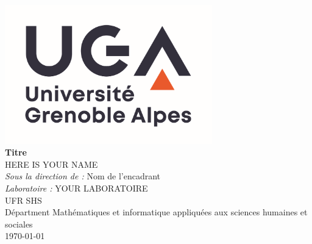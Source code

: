 \documentclass[12pt,oneside,french]{book}
\begin{document}
	\pagestyle{plain}


\frontmatter

\begin{titlepage}
	
	

\begin{center}
\includegraphics[width=9cm]{images/logo.png}\\[1cm]
\linespread{1.2}\huge {\bfseries Titre}\\[1.5cm]
\linespread{1}
{\Large HERE IS YOUR NAME}\\[1cm]
{\large \emph{Sous la direction de :} Nom de l'encadrant}\\[1cm] %
{\large  \emph{Laboratoire :} YOUR LABORATOIRE}\\[1cm]  
{\large
UFR SHS\\
Départment Mathématiques et informatique appliquées aux sciences humaines et sociales\\%
\today}
\end{center}
\end{titlepage}



\newpage

\end{document}
